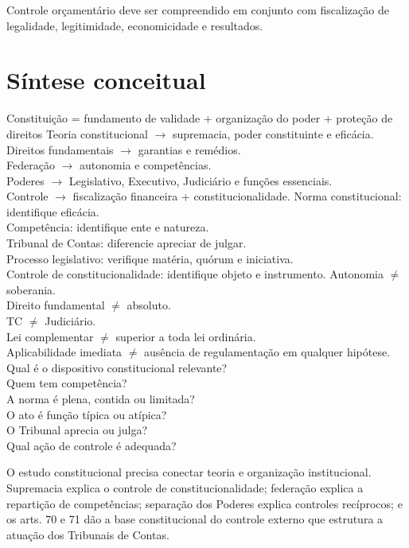 Controle orçamentário deve ser compreendido em conjunto com fiscalização de legalidade, legitimidade, economicidade e resultados.

\section{Síntese conceitual}

{Constituição = fundamento de validade + organização do poder + proteção de direitos}
{Teoria constitucional $\rightarrow$ supremacia, poder constituinte e eficácia.\\Direitos fundamentais $\rightarrow$ garantias e remédios.\\Federação $\rightarrow$ autonomia e competências.\\Poderes $\rightarrow$ Legislativo, Executivo, Judiciário e funções essenciais.\\Controle $\rightarrow$ fiscalização financeira + constitucionalidade.}
{Norma constitucional: identifique eficácia.\\Competência: identifique ente e natureza.\\Tribunal de Contas: diferencie apreciar de julgar.\\Processo legislativo: verifique matéria, quórum e iniciativa.\\Controle de constitucionalidade: identifique objeto e instrumento.}
{Autonomia $\neq$ soberania.\\Direito fundamental $\neq$ absoluto.\\TC $\neq$ Judiciário.\\Lei complementar $\neq$ superior a toda lei ordinária.\\Aplicabilidade imediata $\neq$ ausência de regulamentação em qualquer hipótese.}
{Qual é o dispositivo constitucional relevante?\\Quem tem competência?\\A norma é plena, contida ou limitada?\\O ato é função típica ou atípica?\\O Tribunal aprecia ou julga?\\Qual ação de controle é adequada?}

\begin{resumo}
O estudo constitucional precisa conectar teoria e organização institucional. Supremacia explica o controle de constitucionalidade; federação explica a repartição de competências; separação dos Poderes explica controles recíprocos; e os arts. 70 e 71 dão a base constitucional do controle externo que estrutura a atuação dos Tribunais de Contas.
\end{resumo}
